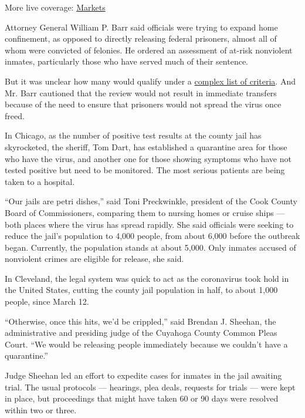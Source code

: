 More live coverage:
\href{https://www.nytimes3xbfgragh.onion/live/2020/09/11/business/stock-market-today-coronavirus?action=click\&pgtype=Article\&state=default\&region=MAIN_CONTENT_1\&context=storylines_live_updates}{Markets}

Attorney General William P. Barr said officials were trying to expand
home confinement, as opposed to directly releasing federal prisoners,
almost all of whom were convicted of felonies. He ordered an assessment
of at-risk nonviolent inmates, particularly those who have served much
of their sentence.

But it was unclear how many would qualify under a
\href{https://www.politico.com/f/?id=00000171-1826-d4a1-ad77-fda671420000}{complex
list of criteria}. And Mr. Barr cautioned that the review would not
result in immediate transfers because of the need to ensure that
prisoners would not spread the virus once freed.

In Chicago, as the number of positive test results at the county jail
has skyrocketed, the sheriff, Tom Dart, has established a quarantine
area for those who have the virus, and another one for those showing
symptoms who have not tested positive but need to be monitored. The most
serious patients are being taken to a hospital.

``Our jails are petri dishes,'' said Toni Preckwinkle, president of the
Cook County Board of Commissioners, comparing them to nursing homes or
cruise ships --- both places where the virus has spread rapidly. She
said officials were seeking to reduce the jail's population to 4,000
people, from about 6,000 before the outbreak began. Currently, the
population stands at about 5,000. Only inmates accused of nonviolent
crimes are eligible for release, she said.

In Cleveland, the legal system was quick to act as the coronavirus took
hold in the United States, cutting the county jail population in half,
to about 1,000 people, since March 12.

``Otherwise, once this hits, we'd be crippled,'' said Brendan J.
Sheehan, the administrative and presiding judge of the Cuyahoga County
Common Pleas Court. ``We would be releasing people immediately because
we couldn't have a quarantine.''

Judge Sheehan led an effort to expedite cases for inmates in the jail
awaiting trial. The usual protocols --- hearings, plea deals, requests
for trials --- were kept in place, but proceedings that might have taken
60 or 90 days were resolved within two or three.

